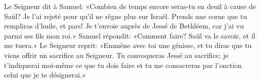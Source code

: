 Le Seigneur dit à Samuel:
	«Combien de temps encore seras-tu en deuil à cause de Saül?
	Je l’ai rejeté pour qu’il ne règne plus sur Israël.
Prends une corne que tu rempliras d’huile, et pars!
	Je t’envoie auprès de Jessé de Bethléem, car j’ai vu parmi ses fils mon roi.»
Samuel répondit:
	«Comment faire?
	Saül va le savoir, et il me tuera.»
Le Seigneur reprit: «Emmène avec toi une génisse,
	et tu diras que tu viens offrir un sacrifice au Seigneur.
Tu convoqueras Jessé au sacrifice;
	je t’indiquerai moi-même ce que tu dois faire
	et tu me consacreras par l’onction celui que je te désignerai.»
